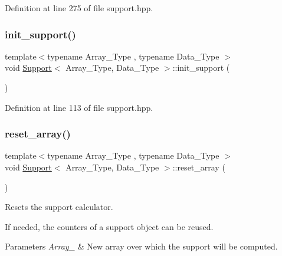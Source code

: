 Definition at line 275 of file support.\+hpp.

\mbox{\label{class_support_aef6fda6e7a0989f53fcd252609d770c9}} 
\subsubsection{\texorpdfstring{init\+\_\+support()}{init\_support()}}
{\footnotesize\ttfamily template$<$typename Array\+\_\+\+Type , typename Data\+\_\+\+Type $>$ \\
void \hyperlink{class_support}{Support}$<$ Array\+\_\+\+Type, Data\+\_\+\+Type $>$\+::init\+\_\+support (\begin{DoxyParamCaption}{ }\end{DoxyParamCaption})\hspace{0.3cm}{\ttfamily [inline]}}



Definition at line 113 of file support.\+hpp.

\mbox{\label{class_support_a831220076ece01ef72abce7c700b6d9b}} 
\subsubsection{\texorpdfstring{reset\+\_\+array()}{reset\_array()}\hspace{0.1cm}{\footnotesize\ttfamily [1/2]}}
{\footnotesize\ttfamily template$<$typename Array\+\_\+\+Type , typename Data\+\_\+\+Type $>$ \\
void \hyperlink{class_support}{Support}$<$ Array\+\_\+\+Type, Data\+\_\+\+Type $>$\+::reset\+\_\+array (\begin{DoxyParamCaption}{ }\end{DoxyParamCaption})\hspace{0.3cm}{\ttfamily [inline]}}



Resets the support calculator. 

If needed, the counters of a support object can be reused.


\begin{DoxyParams}{Parameters}
{\em Array\+\_\+} & New array over which the support will be computed. \\
\hline
\end{DoxyParams}


